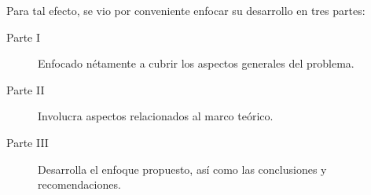 Para tal efecto, se vio por conveniente enfocar su desarrollo en tres partes:

\begin{description}
	\item[Parte I] Enfocado nétamente a cubrir los aspectos generales del problema.
  \item[Parte II] Involucra aspectos relacionados al marco teórico.
	\item[Parte III] Desarrolla el enfoque propuesto, así como las conclusiones y 
	recomendaciones.
\end{description}
